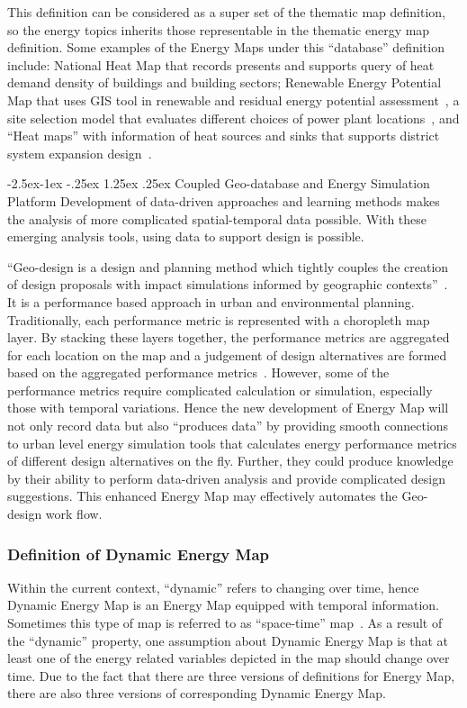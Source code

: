 \documentclass[hidelinks,12pt]{article}
\makeatletter
\renewcommand\paragraph{\@startsection{paragraph}{4}{\z@}%
            {-2.5ex\@plus -1ex \@minus -.25ex}%
            {1.25ex \@plus .25ex}%
            {\normalfont\normalsize\bfseries}}
\makeatother
\begin{document}
This definition can be considered as a super set of the thematic map
definition, so the energy topics inherits those representable in the
thematic energy map definition. Some examples of the Energy Maps under
this ``database'' definition include: National Heat Map that records
presents and supports query of heat demand density of buildings and
building sectors; Renewable Energy Potential Map that uses GIS tool in
renewable and residual energy potential
assessment~\cite{Voivontas1998333}, a site selection model that
evaluates different choices of power plant locations~\cite{Yeo201499},
and ``Heat maps'' with information of heat sources and sinks that
supports district system expansion design~\cite{Finney2012165}.

\paragraph{Coupled Geo-database and Energy Simulation Platform}
Development of data-driven approaches and learning methods makes the
analysis of more complicated spatial-temporal data possible. With
these emerging analysis tools, using data to support design is
possible.

``Geo-design is a design and planning method which tightly couples the
creation of design proposals with impact simulations informed by
geographic contexts''~\cite{Flaxman2010}. It is a performance based
approach in urban and environmental planning. Traditionally, each
performance metric is represented with a choropleth map layer. By
stacking these layers together, the performance metrics are aggregated
for each location on the map and a judgement of design alternatives
are formed based on the aggregated performance
metrics~\cite{CPcp66-goodchild}. However, some of the performance
metrics require complicated calculation or simulation, especially
those with temporal variations. Hence the new development of Energy
Map will not only record data but also ``produces data'' by providing
smooth connections to urban level energy simulation tools that
calculates energy performance metrics of different design alternatives
on the fly. Further, they could produce knowledge by their ability to
perform data-driven analysis and provide complicated design
suggestions. This enhanced Energy Map may effectively automates the
Geo-design work flow.

\subsubsection{Definition of Dynamic Energy Map}
Within the current context, ``dynamic'' refers to changing over time,
hence Dynamic Energy Map is an Energy Map equipped with temporal
information. Sometimes this type of map is referred to as
``space-time'' map~\cite{Brownrigg2005, Dorling1992}. As a result of
the ``dynamic'' property, one assumption about Dynamic Energy Map is
that at least one of the energy related variables depicted in the map
should change over time. Due to the fact that there are three versions
of definitions for Energy Map, there are also three versions of
corresponding Dynamic Energy Map.
\end{document}
